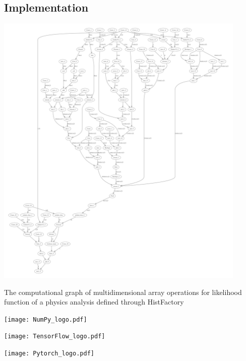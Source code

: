 \documentclass[a0paper,fleqn]{betterposter}
\begin{document}
{ \subsection{Implementation}
 \begin{center}
  \includegraphics[width=0.9\textwidth]{computational_graph3.pdf}
 \end{center}
 The computational graph of multidimensional array operations for likelihood function of a physics analysis defined through HistFactory

 \vspace{0.5em}
 \begin{minipage}{0.33\textwidth}
  \begin{center}
   \texttt{[image: NumPy\_logo.pdf]}
  \end{center}
 \end{minipage}%
 \quad
 \begin{minipage}{0.33\textwidth}
  \begin{center}
   \texttt{[image: TensorFlow\_logo.pdf]}
  \end{center}
 \end{minipage}%
 \quad
 \begin{minipage}{0.33\textwidth}
  \begin{center}
   \texttt{[image: Pytorch\_logo.pdf]}
  \end{center}
 \end{minipage}%
 \vspace{0.5em}

}
\end{document}
